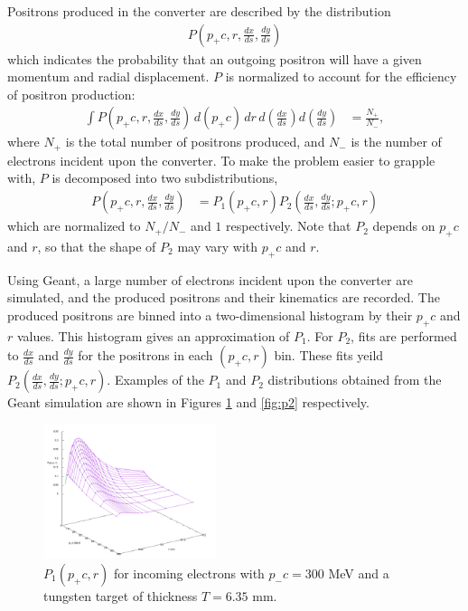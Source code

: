 \documentclass[letter,
               biblatex,     %
               keeplastbox,   %
               ]{jacow}
\newcommand{\dxds}{\frac{dx}{ds}}
\newcommand{\dyds}{\frac{dy}{ds}}
\begin{document}
Positrons produced in the converter are described by the distribution
\begin{align}
P \left( p_+ c, r, \dxds, \dyds \right)
\end{align}
which indicates the probability that an outgoing positron will have a given momentum and radial displacement.
$P$ is normalized to account for the efficiency of positron production:
\begin{align}
\int P \left( p_+ c, r, \dxds, \dyds \right) \, d(p_+ c) \, dr \, d \! \left( \dxds \right) d \! \left( \dyds \right) & = \frac{N_+}{N_-},
\end{align}
where $N_+$ is the total number of positrons produced, and $N_-$ is the number of electrons incident upon the converter.
To make the problem easier to grapple with, $P$ is decomposed into two subdistributions,
\begin{align}
P \left( p_+ c, r, \dxds, \dyds \right) & = P_1 \left( p_+ c, r \right) P_2 \left( \dxds, \dyds ; p_+ c, r \right)
\end{align}
which are normalized to $N_+/N_-$ and $1$ respectively.
Note that $P_2$ depends on $p_+ c$ and $r$, so that the shape of $P_2$ may vary with $p_+ c$ and $r$.

Using Geant\cite{geant}, a large number of electrons incident upon the converter are simulated, and the produced positrons and their kinematics are recorded.
The produced positrons are binned into a two-dimensional histogram by their $p_+ c$ and $r$ values.
This histogram gives an approximation of $P_1$.
For $P_2$, fits are performed to $\dxds$ and $\dyds$ for the positrons in each $(p_+c, r)$ bin.
These fits yeild $P_2 \left( \dxds, \dyds ; p_+ c, r \right)$.
Examples of the $P_1$ and $P_2$ distributions obtained from the Geant simulation are shown in Figures \ref{fig:p1} and \ref{fig:p2} respectively.

\begin{figure}
\centering
\includegraphics[width=0.45\textwidth]{p1}
\caption{$P_1(p_+ c, r)$ for incoming electrons with $p_- c = 300$ MeV and a tungsten target of thickness $T = 6.35$ mm.}
\label{fig:p1}
\end{figure}
\end{document}

